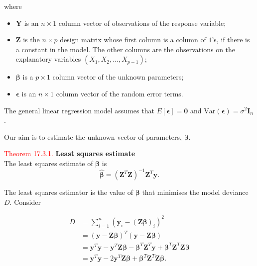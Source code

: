 \documentclass[
]{book}
\providecommand{\tightlist}{%
  \setlength{\itemsep}{0pt}\setlength{\parskip}{0pt}}
\begin{document}
where

\begin{itemize}
\tightlist
\item
  \(\mathbf{Y}\) is an \(n \times 1\) column vector of observations of the response variable;\\
\item
  \(\mathbf{Z}\) is the \(n \times p\) design matrix whose first column is a column of \(1\)'s, if there is a constant in the model. The other columns are the observations on the explanatory variables \((X_1,X_2,\dots,X_{p-1})\);\\
\item
  \(\mathbf{\beta}\) is a \(p \times 1\) column vector of the unknown parameters;\\
\item
  \(\mathbf{\epsilon}\) is an \(n \times 1\) column vector of the random error terms.
\end{itemize}

The general linear regression model assumes that \(E[\mathbf{\epsilon}]=\mathbf{0}\) and \(\text{Var}(\mathbf{\epsilon}) = \sigma^2 \mathbf{I}_n\).

Our aim is to estimate the unknown vector of parameters, \(\mathbf{\beta}\).

\hypertarget{Sec_Linear_LSE:thm:lse}{}
\textcolor{red}{Theorem 17.3.1.}
{\textbf{Least squares estimate}}\\
The least squares estimate of \(\mathbf{\beta}\) is\\

\[\mathbf{\hat{\beta}} =(\mathbf{Z}^T\mathbf{Z})^{-1} \mathbf{Z}^T\mathbf{y}.\]

\leavevmode{}%
The least squares estimator is the value of \(\mathbf{\beta}\) that minimises the model deviance \(D\). Consider

\begin{align*}
D &= \sum\limits_{i=1}^n (\mathbf{y}_i - (\mathbf{Z}\mathbf{\beta})_i)^2 \\[3pt]
&= (\mathbf{y} - \mathbf{Z} \mathbf{\beta})^T (\mathbf{y} - \mathbf{Z} \mathbf{\beta}) \\[3pt]
&= \mathbf{y}^T\mathbf{y} - \mathbf{y}^T\mathbf{Z}\mathbf{\beta} - \mathbf{\beta}^T\mathbf{Z}^T\mathbf{y} + \mathbf{\beta}^T\mathbf{Z}^T\mathbf{Z}\mathbf{\beta} \\[3pt]
&= \mathbf{y}^T\mathbf{y} - 2\mathbf{y}^T\mathbf{Z}\mathbf{\beta} + \mathbf{\beta}^T\mathbf{Z}^T\mathbf{Z}\mathbf{\beta}.
\end{align*}
\end{document}
